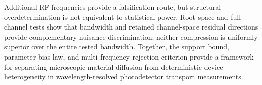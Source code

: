 \documentclass[aps,pra,twocolumn,superscriptaddress,nofootinbib]{revtex4-2}
\begin{document}
Additional RF frequencies provide a falsification route, but structural overdetermination is not equivalent to statistical power. Root-space and full-channel tests show that bandwidth and retained channel-space residual directions provide complementary nuisance discrimination; neither compression is uniformly superior over the entire tested bandwidth. Together, the support bound, parameter-bias law, and multi-frequency rejection criterion provide a framework for separating microscopic material diffusion from deterministic device heterogeneity in wavelength-resolved photodetector transport measurements.



\end{document}
